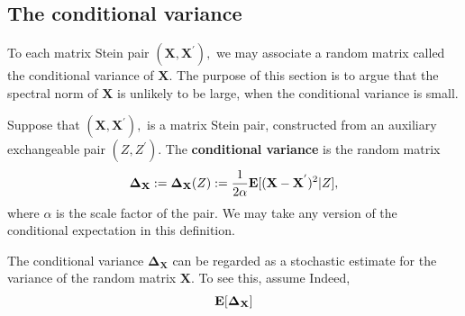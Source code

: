 \subsection{The conditional variance}
To each matrix Stein pair 
  $
  (
    \mathbf{X}
    ,
    \mathbf{X}^{'}
  ),
  $
  we may associate a random matrix called the conditional variance of $\mathbf{X}.$
  The purpose of this section is to argue that the spectral norm of $\mathbf{X}$
  is unlikely to be large, when the conditional variance is small.
\begin{definition}
  Suppose that
  $
  (
    \mathbf{X}
    ,
    \mathbf{X}^{'}
  ),
  $
  is a matrix Stein pair, constructed from an auxiliary exchangeable pair
  $
  (
  Z
    ,
  Z^{'}
  ).
  $
  The \textbf{conditional variance}
  is the random matrix
  \begin{gather}
    \mathbf{\Delta_X}
    :=
    \mathbf{\Delta_X}
    (Z)
    :=
    \frac{1}{2\alpha}
    \mathbf{E}
    [
    (
    \mathbf{X}
    -
    \mathbf{X}^{'}
    )^2
    \vert
    Z
    ]
    ,
  \end{gather}
  where $\alpha$ is the scale factor of the pair. We may take any version of the conditional expectation in this definition.
\end{definition}

The conditional variance
$
    \mathbf{\Delta_X}
$
can be regarded as a stochastic estimate for the variance 
of the random matrix $\mathbf{X}.$
To see this, assume
Indeed, 
\begin{gather}
  \mathbf{E}
  [
    \mathbf{\Delta_X}
  ]
\end{gather}
